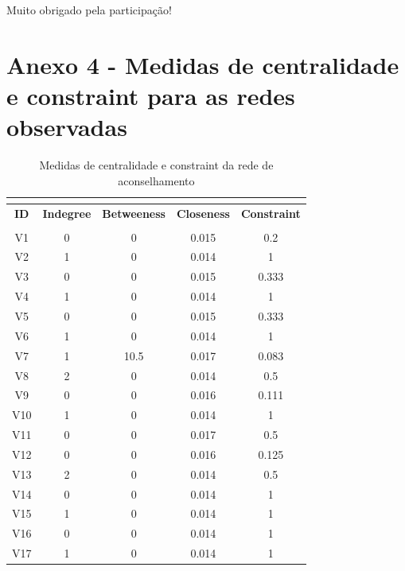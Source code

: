 \documentclass[a4paper, 12pt, openright, oneside, german, french, english, brazil]{abntex2}
\begin{document}
	Muito obrigado pela participação!




	\chapter*[Anexo 4]{Anexo 4 - Medidas de centralidade e constraint para as redes observadas}


		\begin{SingleSpace}
		\begin{footnotesize}
			\begin{center}
				\begin{longtable}{c c c c c}
					\caption{Medidas de centralidade e constraint da rede de aconselhamento}\\
					\label{centralidades:conselho}\\
					\hline
					\textbf{ID}  & \textbf{Indegree} & \textbf{Betweeness} & \textbf{Closeness} & \textbf{Constraint} \\
					\hline
					\endfirsthead
					\hline
					\endhead
					\hline
					\endfoot
					\hline
					\multicolumn{5}{l}{Fonte: Elaboração do autor}\\
					\endlastfoot
					V1 & 0 & 0 & 0.015 & 0.2 \\ 
					V2 & 1 & 0 & 0.014 & 1 \\ 
					V3 & 0 & 0 & 0.015 & 0.333 \\ 
					V4 & 1 & 0 & 0.014 & 1 \\ 
					V5 & 0 & 0 & 0.015 & 0.333 \\ 
					V6 & 1 & 0 & 0.014 & 1 \\ 
					V7 & 1 & 10.5 & 0.017 & 0.083 \\ 
					V8 & 2 & 0 & 0.014 & 0.5 \\ 
					V9 & 0 & 0 & 0.016 & 0.111 \\ 
					V10 & 1 & 0 & 0.014 & 1 \\ 
					V11 & 0 & 0 & 0.017 & 0.5 \\ 
					V12 & 0 & 0 & 0.016 & 0.125 \\ 
					V13 & 2 & 0 & 0.014 & 0.5 \\ 
					V14 & 0 & 0 & 0.014 & 1 \\ 
					V15 & 1 & 0 & 0.014 & 1 \\ 
					V16 & 0 & 0 & 0.014 & 1 \\ 
					V17 & 1 & 0 & 0.014 & 1 \\ 

\end{longtable}
\end{center}
\end{footnotesize}
\end{SingleSpace}
\end{document}
